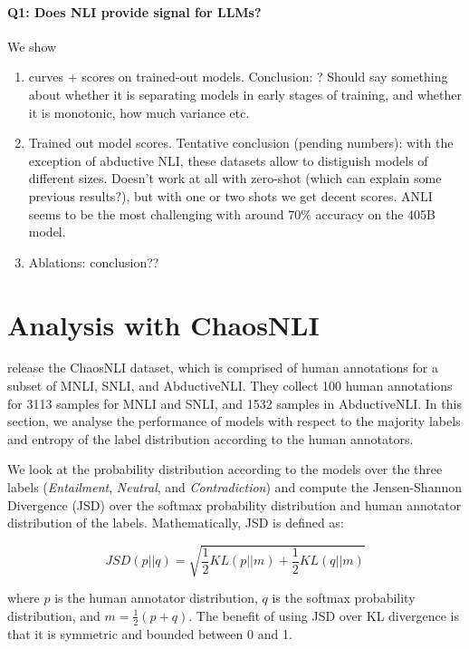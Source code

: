 \paragraph{Q1: Does NLI provide signal for LLMs?}
We show \begin{enumerate}
    \item curves + scores on trained-out models.  Conclusion: ? Should say something about whether it is separating models in early stages of training, and whether it is monotonic, how much variance etc.
    \item Trained out model scores. Tentative conclusion (pending numbers): with the exception of abductive NLI, these datasets allow to distiguish models of different sizes. Doesn't work at all with zero-shot (which can explain some previous results?), but with one or two shots we get decent scores. ANLI seems to be the most challenging with around 70\% accuracy on the 405B model.
    \item Ablations: conclusion??
\end{enumerate}

\section{Analysis with ChaosNLI}

\citet{nie-etal-2020-learn} release the ChaosNLI dataset, which is comprised of human annotations for a subset of MNLI, SNLI, and AbductiveNLI. They collect 100 human annotations for 3113 samples for MNLI and SNLI, and 1532 samples in AbductiveNLI. In this section, we analyse the performance of models with respect to the majority labels and entropy of the label distribution according to the human annotators.

We look at the probability distribution according to the models over the three labels (\textit{Entailment}, \textit{Neutral}, and \textit{Contradiction}) and compute the Jensen-Shannon Divergence (JSD) \citep{menendez1997jensen} over the softmax probability distribution and human annotator distribution of the labels. Mathematically, JSD is defined as:

\begin{equation}
    \scriptstyle JSD(p || q) = \sqrt{\frac{1}{2}KL(p || m) + \frac{1}{2}KL(q || m)}
\end{equation}

where $p$ is the human annotator distribution, $q$ is the softmax probability distribution, and $m = \frac{1}{2}(p + q)$. The benefit of using JSD over KL divergence is that it is symmetric and bounded between 0 and 1.

